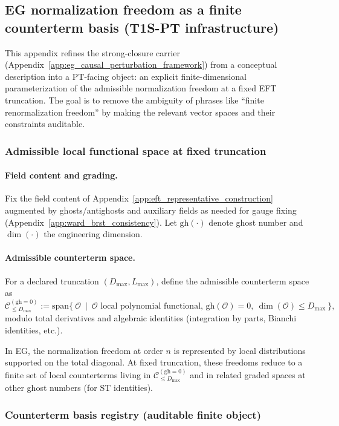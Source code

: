 \subsection{EG normalization freedom as a finite counterterm basis (T1S-PT infrastructure)}
\label{app:eg_normalization_freedom_basis}

\AuditTag This appendix refines the strong-closure carrier (Appendix~\ref{app:eg_causal_perturbation_framework}) from a conceptual description into a PT-facing object: an explicit finite-dimensional parameterization of the admissible normalization freedom at a fixed EFT truncation.
The goal is to remove the ambiguity of phrases like ``finite renormalization freedom'' by making the relevant vector spaces and their constraints auditable.

\subsubsection{Admissible local functional space at fixed truncation}
\paragraph{Field content and grading.}
Fix the field content of Appendix~\ref{app:eft_representative_construction} augmented by ghosts/antighosts and auxiliary fields as needed for gauge fixing (Appendix~\ref{app:ward_brst_consistency}).
Let $\mathrm{gh}(\cdot)$ denote ghost number and $\dim(\cdot)$ the engineering dimension.

\paragraph{Admissible counterterm space.}
For a declared truncation $(D_{\max},L_{\max})$, define the admissible counterterm space as
\[
\mathcal{C}_{\le D_{\max}}^{(\mathrm{gh}=0)}
:=\mathrm{span}\{\ \mathcal{O}\ \mid\ \mathcal{O}\text{ local polynomial functional, }\mathrm{gh}(\mathcal{O})=0,\ \dim(\mathcal{O})\le D_{\max}\ \},
\]
modulo total derivatives and algebraic identities (integration by parts, Bianchi identities, etc.).

\AuditTag In EG, the normalization freedom at order $n$ is represented by local distributions supported on the total diagonal.
At fixed truncation, these freedoms reduce to a finite set of local counterterms living in $\mathcal{C}_{\le D_{\max}}^{(\mathrm{gh}=0)}$ and in related graded spaces at other ghost numbers (for ST identities).

\subsubsection{Counterterm basis registry (auditable finite object)}
